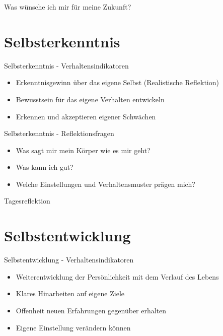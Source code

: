 \begin{frame}[standout]
    Was wünsche ich mir für meine Zukunft?
\end{frame}





\section{Selbsterkenntnis}

\begin{frame}[c]{Selbsterkenntnis - Verhaltensindikatoren}
    \begin{itemize}
    \item Erkenntnisgewinn über das eigene Selbst (Realistische Reflektion) \newline
    \pause
    \item Bewusstsein für das eigene Verhalten entwickeln \newline
    \pause
    \item Erkennen und akzeptieren eigener Schwächen \newline
    \end{itemize}
\end{frame}


\begin{frame}[c]{Selbsterkenntnis - Reflektionsfragen}
    \begin{itemize}
    \item Was sagt mir mein Körper wie es mir geht? \newline
    \pause
    \item Was kann ich gut? \newline
    \pause
    \item Welche Einstellungen und Verhaltensmuster prägen mich?
    \end{itemize}
\end{frame}


\begin{frame}[standout]
    \huge
    Tagesreflektion
\end{frame}





\section{Selbstentwicklung}

\begin{frame}[c]{Selbstentwicklung - Verhaltensindikatoren}
    \begin{itemize}
    \item Weiterentwicklung der Persönlichkeit mit dem Verlauf des Lebens
    \pause
    \item Klares Hinarbeiten auf eigene Ziele
    \pause
    \item Offenheit neuen Erfahrungen gegenüber erhalten
    \pause
    \item Eigene Einstellung verändern können
    \end{itemize}
\end{frame}


